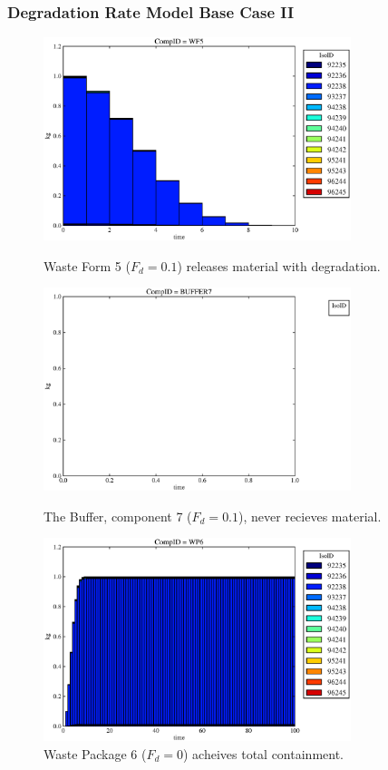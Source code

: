 \begin{frame}
  \frametitle{Degradation Rate Model Base Case II}
  \begin{figure}
\begin{minipage}[b]{0.45\linewidth}

  \includegraphics[width=0.8\textwidth]{./images/drII1.eps}
  \caption[DRII Waste Form Contaminants.]{
    Waste Form 5 ($F_d = 0.1$) releases material with degradation. 
    }
  \label{fig:drIIwf5}
  
  \includegraphics[width=0.8\textwidth]{./images/drII3.eps}
  \caption[Case DRII Buffer Contaminants]{
    The Buffer, component 7 ($F_d = 0.1$), never recieves material.
    }
  \label{fig:drIIbuff}

\end{minipage}
\hspace{0.05\linewidth}
\begin{minipage}[b]{0.45\linewidth}
  \includegraphics[width=0.8\textwidth]{./images/drII2.eps}
  \caption[Case DRII Waste Package Contaminants.]{ 
    Waste Package 6 ($F_d = 0$) acheives total containment.
    }
  \label{fig:drIIwp6}


\end{minipage}
\end{figure}
\end{frame}
